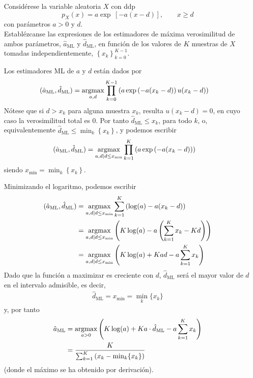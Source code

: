 \ifspanish

\question Considérese la variable aleatoria $X$ con ddp
$$p_X(x) = a\exp\ [-a(x-d) ],  \qquad x \ge d$$
con parámetros $a>0$ y $d$.\\
Establézcanse las expresiones de los estimadores de máxima verosimilitud de ambos parámetros, $\hat{a}_\text{ML}$ y $\hat{d}_\text{ML}$, en funci\'{o}n de los valores de $K$ muestras de $X$ tomadas independientemente, $\left\{x_k\right\}^{K-1}_{k=0}$.

\begin{solution}
Los estimadores ML de $a$ y $d$ están dados por
\begin{align*}
(\hat{a}_\text{ML}, \hat{d}_\text{ML}) 
	&= \operatorname*{argmax}_{a, d} \prod_{k=0}^{K-1} \left(a\exp\left(-a(x_k-d) \right)u(x_k - d)\right)
\end{align*}
Nótese que si $d > x_k$ para alguna muestra $x_k$, resulta $u(x_k - d)=0$, en cuyo caso la verosimilitud total es 0. Por tanto $\hat{d}_\text{ML} \le x_k$, para todo $k$, o, equivalentemente  $\hat{d}_\text{ML} \le \min_k \left\{x_k\right\}$, y podemos escribir
\begin{align*}
(\hat{a}_\text{ML}, \hat{d}_\text{ML}) 
	&= \operatorname*{argmax}_{a, d \mid d \le x_{\min} } 
	       \prod_{k=1}^{K} \left(a\exp\left(-a(x_k-d) \right)\right)
\end{align*}
siendo $x_{\min} = \min_k \left\{x_k\right\}$. 

Minimizando el logaritmo, podemos escribir
\begin{align*}
(\hat{a}_\text{ML}, \hat{d}_\text{ML}) 
	&= \operatorname*{argmax}_{a, d \mid d \le x_{\min}}
	       \sum_{k=1}^{K} \left(\log(a) -a (x_k-d) \right) \\
	&= \operatorname*{argmax}_{a, d \mid d \le x_{\min}} 
	       \left(K\log(a) -a \left(\sum_{k=1}^{K} x_k- Kd\right) \right) \\
	&= \operatorname*{argmax}_{a, d \mid d \le x_{\min}} 
	       \left(K\log(a) + Kad - a \sum_{k=1}^{K} x_k \right)
\end{align*}
Dado que  la función a maximizar es creciente con $d$, $\hat{d}_\text{ML}$ será el mayor valor de $d$ en el intervalo admisible, es decir,
\begin{align*}
\hat{d}_\text{ML} = x_{\min} = \min_{k}\{x_k\}
\end{align*}
y, por tanto
\begin{align*}
\hat{a}_\text{ML} 
	&= \operatorname*{argmax}_{a > 0} \left(K\log(a) + Ka\cdot \hat{d}_\text{ML} - a \sum_{k=1}^{K} x_k \right) \\
	&= \frac{K}{\sum^{K}_{k=1} \left(x_k-\min_k\{x_k\} \right)}	
\end{align*}
(donde el máximo se ha obtenido por derivación).
\end{solution}

